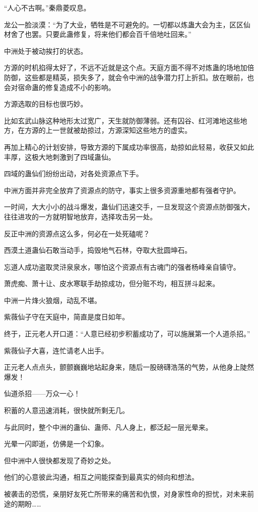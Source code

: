 \begin{this_body}
“人心不古啊。”秦鼎菱叹息。

龙公一脸淡漠：“为了大业，牺牲是不可避免的。一切都以炼蛊大会为主，区区仙材舍了也罢。只要此蛊修复，将来他们都会百千倍地吐回来。”

中洲处于被动挨打的状态。

方源的时机掐得太好了，不远不近就是这个点。天庭方面不得不对炼蛊的场地加倍防御，这些都是精英，损失多了，就会令中洲的战争潜力打上折扣。放在眼前，也会对宿命蛊的修复造成不小的影响。

方源选取的目标也很巧妙。

比如玄武山脉这种地形太过宽广，天生就防御薄弱。还有囚谷、红河滩地这些地方，在方源的上一世就被劫掠过，方源深知这些地方的虚实。

再加上精心的计划安排，导致方源的下属成功率很高，劫掠如此轻易，收获又如此丰厚，这极大地刺激到了四域蛊仙。

四域的蛊仙们纷纷出动，对各处资源点下手。

中洲方面并非完全放弃了资源点的防守，事实上很多资源重地都有强者守护。

一时间，大大小小的战斗爆发，蛊仙们迅速交手，一旦发现这个资源点防御强大，往往进攻的一方就明智地放弃，选择攻击另一处。

反正中洲的资源点这么多，何必在一处死磕呢？

西漠土道蛊仙石敢当动手，捣毁地气石林，夺取大批圆坤石。

忘道人成功盗取灵浒泉泉水，哪怕这个资源点有古魂门的强者杨峰亲自镇守。

萧虎痴、萧十让、皮水寒联手劫掠成功，但分赃不均，相互拼斗起来。

中洲一片烽火狼烟，动乱不堪。

紫薇仙子守在天庭中，简直是度日如年。

终于，正元老人开口道：“人意已经初步积蓄成功了，可以施展第一个人道杀招。”

紫薇仙子大喜，连忙请老人出手。

正元老人点点头，颤颤巍巍地站起身来，随后一股磅礴浩荡的气势，从他身上陡然爆发！

仙道杀招——万众一心！

积蓄的人意迅速消耗，很快就所剩无几。

与此同时，整个中洲的蛊仙、蛊师、凡人身上，都泛起一层光晕来。

光晕一闪即逝，仿佛是一个幻象。

但中洲中人很快都发现了奇妙之处。

他们的心意彼此沟通，相互之间能探查到最真实的倾向和想法。

被袭击的恐慌，亲朋好友死亡所带来的痛苦和仇恨，对身家性命的担忧，对未来前途的期盼……


\end{this_body}
